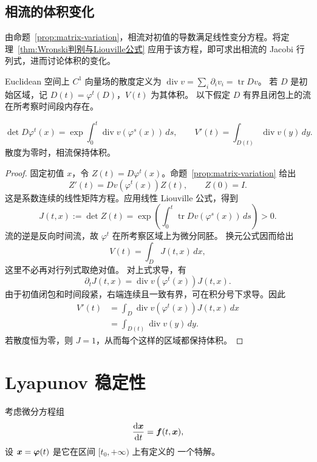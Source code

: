 \subsection*{相流的体积变化}
\label{sec:nonlinear-volume}
由命题~\ref{prop:matrix-variation}，相流对初值的导数满足线性变分方程。将定理~\ref{thm:Wronski判别与Liouville公式} 应用于该方程，即可求出相流的 Jacobi 行列式，进而讨论体积的变化。
\begin{definition}
Euclidean 空间上 $C^1$ 向量场的散度定义为
$\operatorname{div}v=\sum_i\partial_i v_i=\operatorname{tr}Dv$。
若 $D$ 是初始区域，记 $D(t)=\varphi^t(D)$，$V(t)$ 为其体积。
以下假定 $D$ 有界且闭包上的流在所考察时间段内存在。
\end{definition}
\begin{theorem}\label{thm:nonlinear-liouville}
\[
 \det D\varphi^t(x)
 =\exp\int_0^t\operatorname{div}v(\varphi^s(x))\,ds,
 \qquad V'(t)=\int_{D(t)}\operatorname{div}v(y)\,dy.
\]
散度为零时，相流保持体积。
\end{theorem}
\begin{proof}
固定初值 $x$，令 $Z(t)=D\varphi^t(x)$。命题~\ref{prop:matrix-variation} 给出
\[
 Z'(t)=Dv(\varphi^t(x))Z(t),\qquad Z(0)=I.
\]
这是系数连续的线性矩阵方程。应用线性 Liouville 公式，得到
\[
 J(t,x):=\det Z(t)
 =\exp\left(\int_0^t\operatorname{tr}Dv(\varphi^s(x))\,ds\right)>0.
\]
流的逆是反向时间流，故 $\varphi^t$ 在所考察区域上为微分同胚。
换元公式因而给出 
\[
 V(t)=\displaystyle\int_DJ(t,x)\,dx,
\]
这里不必再对行列式取绝对值。
对上式求导，有
\[
 \partial_tJ(t,x)=\operatorname{div}v(\varphi^t(x))J(t,x).
\]
由于初值闭包和时间段紧，右端连续且一致有界，可在积分号下求导。因此
\begin{align*}
 V'(t)&=\int_D\operatorname{div}v(\varphi^t(x))J(t,x)\,dx\\
 &=\int_{D(t)}\operatorname{div}v(y)\,dy.
\end{align*}
若散度恒为零，则 $J=1$，从而每个这样的区域都保持体积。
\end{proof}

\section{Lyapunov 稳定性}\label{sec:Lyapunov稳定性}

考虑微分方程组
\[
	\dfrac{\mathrm{d}\boldsymbol{x}}{\mathrm{d} t}=\boldsymbol{f}(t,\boldsymbol{x}),
\]
设 $\boldsymbol{x}=\boldsymbol{\varphi}(t)$ 是它在区间 $[t_0,+\infty)$ 上有定义的
一个特解。

